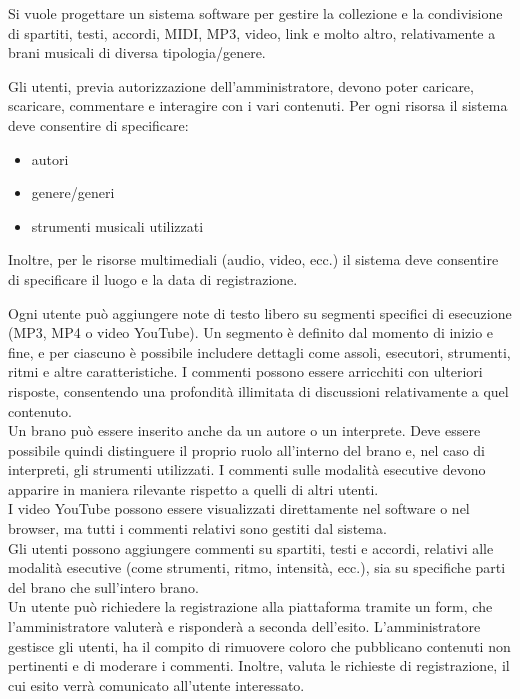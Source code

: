 \documentclass[a4paper]{article}
\begin{document}
Si vuole progettare un sistema software per gestire la collezione e la condivisione 
di spartiti, testi, accordi, MIDI, MP3, video, link e molto altro, relativamente a brani 
musicali di diversa tipologia/genere.


Gli utenti, previa autorizzazione dell'amministratore, devono poter caricare, 
scaricare, commentare e interagire con i vari contenuti. Per ogni risorsa il sistema deve
consentire di specificare:
\begin{itemize}
    \item autori
    \item genere/generi
    \item strumenti musicali utilizzati
\end{itemize}

Inoltre, per le risorse multimediali (audio, video, ecc.) il sistema deve
consentire di specificare il luogo e la data di registrazione.

Ogni utente può aggiungere note di testo libero su segmenti specifici di esecuzione (MP3, MP4 o video YouTube).  
Un segmento è definito dal momento di inizio e fine, e per ciascuno è possibile includere dettagli come assoli, esecutori, strumenti,
ritmi e altre caratteristiche. I commenti possono essere arricchiti con ulteriori 
risposte, consentendo una profondità illimitata di discussioni relativamente a quel 
contenuto.\\[2ex]

Un brano può essere inserito anche da un autore o un interprete. Deve essere possibile 
quindi distinguere il proprio ruolo all’interno del brano e, nel caso di interpreti, 
gli strumenti utilizzati. I commenti sulle modalità esecutive devono apparire in maniera 
rilevante rispetto a quelli di altri utenti.\\[2ex]

I video YouTube possono essere visualizzati direttamente nel software o nel browser, 
ma tutti i commenti relativi sono gestiti dal sistema.\\[2ex]

Gli utenti possono aggiungere commenti su spartiti, testi e accordi, 
relativi alle modalità esecutive (come strumenti, ritmo, intensità, ecc.), sia su 
specifiche parti del brano che sull'intero brano.\\[2ex]

Un utente può richiedere la registrazione alla piattaforma tramite un form, che 
l'amministratore valuterà e risponderà a seconda dell’esito.  
L'amministratore gestisce gli utenti, ha il compito di rimuovere coloro che pubblicano contenuti non pertinenti 
e di moderare i commenti. Inoltre, valuta le richieste di registrazione, il cui esito verrà comunicato 
all’utente interessato.\\[2ex]
\end{document}
